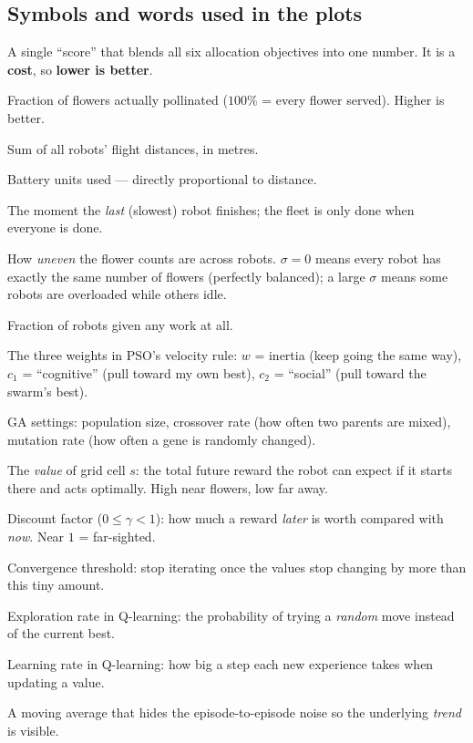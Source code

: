 \documentclass[11pt]{article}
\begin{document}
\subsection{Symbols and words used in the plots}
\begin{description}[leftmargin=2.2em,style=nextline,itemsep=2pt,topsep=3pt]
  \item[Fitness] A single ``score'' that blends all six allocation objectives
        into one number. It is a \textbf{cost}, so \textbf{lower is better}.
  \item[Coverage] Fraction of flowers actually pollinated ($100\%$ = every
        flower served). Higher is better.
  \item[Total distance] Sum of all robots' flight distances, in metres.
  \item[Energy] Battery units used --- directly proportional to distance.
  \item[Completion time / makespan] The moment the \emph{last} (slowest) robot
        finishes; the fleet is only done when everyone is done.
  \item[Workload std.\ dev.\ ($\sigma$)] How \emph{uneven} the flower counts
        are across robots. $\sigma=0$ means every robot has exactly the same
        number of flowers (perfectly balanced); a large $\sigma$ means some
        robots are overloaded while others idle.
  \item[Utilization] Fraction of robots given any work at all.
  \item[$w,\,c_1,\,c_2$ (PSO)] The three weights in PSO's velocity rule:
        $w$ = inertia (keep going the same way), $c_1$ = ``cognitive'' (pull
        toward my own best), $c_2$ = ``social'' (pull toward the swarm's best).
  \item[pop, cx, mut (GA)] GA settings: population size, crossover rate
        (how often two parents are mixed), mutation rate (how often a gene is
        randomly changed).
  \item[$U(s)$] The \emph{value} of grid cell $s$: the total future reward the
        robot can expect if it starts there and acts optimally. High near
        flowers, low far away.
  \item[$\gamma$ (gamma)] Discount factor ($0\le\gamma<1$): how much a reward
        \emph{later} is worth compared with \emph{now}. Near $1$ = far-sighted.
  \item[$\theta$ (theta)] Convergence threshold: stop iterating once the values
        stop changing by more than this tiny amount.
  \item[$\varepsilon$ (epsilon)] Exploration rate in Q-learning: the
        probability of trying a \emph{random} move instead of the current best.
  \item[$\alpha$ (alpha)] Learning rate in Q-learning: how big a step each new
        experience takes when updating a value.
  \item[``smoothed'' / ``rolling'' / ``100-ep average'']  A moving average that
        hides the episode-to-episode noise so the underlying \emph{trend} is
        visible.
\end{description}
\end{document}
